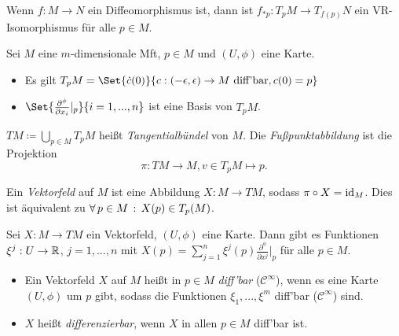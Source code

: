 \documentclass{cheat-sheet}
\begin{document}
\begin{kor}
  Wenn $f : M \to N$ ein Diffeomorphismus ist, dann ist $f_{*p} : T_p M \to T_{f(p)} N$ ein VR-Isomorphismus für alle $p \in M$.
\end{kor}

\begin{satz}
  Sei $M$ eine $m$-dimensionale Mft, $p \in M$ und $(U, \phi)$ eine Karte.
  \begin{itemize}
    \item Es gilt $T_p M = \Set{ \dot{c}(0) }{ c : \ointerval{-\epsilon}{\epsilon} \to M \text{ diff'bar}, c(0) = p }$
    \item $\Set{\tfrac{\partial^\phi}{\partial x_i}|_p}{i=1,...,n}$ ist eine Basis von $T_p M$.
  \end{itemize}
\end{satz}

\begin{defn}
  $TM \coloneqq \bigcup_{p \in M} T_p M$ heißt \emph{Tangentialbündel} von $M$. Die \emph{Fußpunktabbildung} ist die Projektion
  \[ \pi : TM \to M, v \in T_p M \mapsto p. \]
\end{defn}


\begin{defn}
  Ein \emph{Vektorfeld} auf $M$ ist eine Abbildung $X : M \to TM$, sodass $\pi \circ X = \mathrm{id}_M$. Dies ist äquivalent zu $\forall \, {p \in M} \,:\, X(p) \in T_p(M)$.
\end{defn}

\begin{bem}
  Sei $X : M \to TM$ ein Vektorfeld, $(U, \phi)$ eine Karte. Dann gibt es Funktionen $\xi^j : U \to \mathbb{R}$, $j = 1, ..., n$ mit $X(p) = \sum_{j=1}^n \xi^j(p) \tfrac{\partial^\phi}{\partial x^j}|_p$ für alle $p \in M$.
\end{bem}

\begin{defn}
  \begin{itemize}
    \item Ein Vektorfeld $X$ auf $M$ heißt in $p \in M$ \emph{diff'bar} ($\mathcal{C}^\infty$), wenn es eine Karte $(U, \phi)$ um $p$ gibt, sodass die Funktionen $\xi_1, ..., \xi^m$ diff'bar ($\mathcal{C}^\infty$) sind.
    \item $X$ heißt \emph{differenzierbar}, wenn $X$ in allen $p \in M$ diff'bar ist.
  \end{itemize}
\end{defn}
\end{document}
